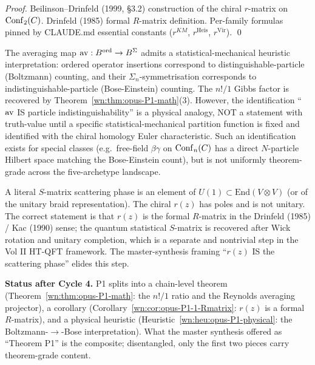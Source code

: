 \begin{proof}
Beilinson--Drinfeld (1999, §3.2) construction of the chiral $r$-matrix
on $\mathrm{Conf}_2(C)$. Drinfeld (1985) formal $R$-matrix definition.
Per-family formulas pinned by CLAUDE.md essential constants
($r^{KM}$, $r^{\mathrm{Heis}}$, $r^{\mathrm{Vir}}$). \qed
\end{proof}

\begin{heuristic}
\label{wn:heu:opus-P1-physical}\ClaimStatusHeuristic
The averaging map $\mathrm{av}: B^{\mathrm{ord}} \to B^{\Sigma}$ admits a statistical-mechanical
heuristic interpretation: ordered operator insertions correspond to
distinguishable-particle (Boltzmann) counting, and their
$\Sigma_n$-symmetrisation corresponds to indistinguishable-particle
(Bose-Einstein) counting. The $n!/1$ Gibbs factor is recovered by
Theorem~\ref{wn:thm:opus-P1-math}(3). However, the identification
``$\mathrm{av}$ IS particle indistinguishability'' is a physical analogy, NOT
a statement with truth-value until a specific statistical-mechanical
partition function is fixed and identified with the chiral homology
Euler characteristic. Such an identification exists for special classes
(e.g.\ free-field $\beta\gamma$ on $\mathrm{Conf}_n(C)$ has a direct
$N$-particle Hilbert space matching the Bose-Einstein count), but is
not uniformly theorem-grade across the five-archetype landscape.
\end{heuristic}

\begin{remark}
\label{wn:rem:opus-scattering-phase-caveat}
A literal $S$-matrix scattering phase is an element of $U(1)
\subset \mathrm{End}(V \otimes V)$ (or of the unitary braid
representation). The chiral $r(z)$ has poles and is not unitary. The
correct statement is that $r(z)$ is the formal $R$-matrix in the
Drinfeld (1985) / Kac (1990) sense; the quantum statistical
$S$-matrix is recovered after Wick rotation and unitary
completion, which is a separate and nontrivial step in the Vol II
HT-QFT framework. The master-synthesis framing ``$r(z)$ IS the
scattering phase'' elides this step.
\end{remark}

\textbf{Status after Cycle 4.} P1 splits into a chain-level theorem
(Theorem~\ref{wn:thm:opus-P1-math}: the $n!/1$ ratio and the Reynolds
averaging projector), a corollary (Corollary~\ref{wn:cor:opus-P1-1-Rmatrix}:
$r(z)$ is a formal $R$-matrix), and a physical heuristic
(Heuristic~\ref{wn:heu:opus-P1-physical}: the Boltzmann-$\to$-Bose
interpretation). What the master synthesis offered as ``Theorem P1''
is the composite; disentangled, only the first two pieces carry
theorem-grade content.

